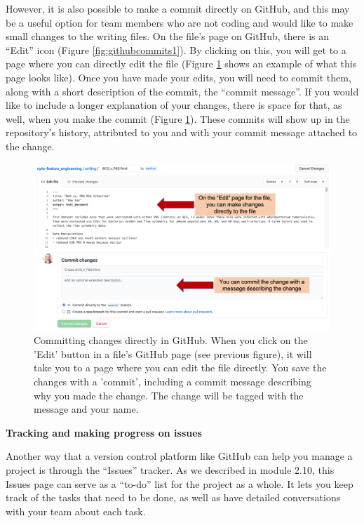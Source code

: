 \documentclass[]{tufte-book}
\begin{document}
However, it is also possible to make a commit directly on GitHub, and this may
be a useful option for team members who are not coding and would like to make
small changes to the writing files. On the file's page on GitHub, there is an
``Edit'' icon (Figure \ref{fig:githubcommits1}). By clicking on this, you will
get to a page where you can directly edit the file (Figure
\ref{fig:githubcommits2} shows an example of what this page looks like). Once
you have made your edits, you will need to commit them, along with a short
description of the commit, the ``commit message''. If you would like to include a
longer explanation of your changes, there is space for that, as well, when you
make the commit (Figure \ref{fig:githubcommits2}). These commits will show up
in the repository's history, attributed to you and with your commit message
attached to the change.

\begin{figure}
\includegraphics[width=\textwidth]{figures/github_commits2} \caption[Committing changes directly in GitHub]{Committing changes directly in GitHub. When you click on the 'Edit' button in a file's GitHub page (see previous figure), it will take you to a page where you can edit the file directly. You save the changes with a 'commit', including a commit message describing why you made the change. The change will be tagged with the message and your name.}\label{fig:githubcommits2}
\end{figure}

\textbf{Tracking and making progress on issues}

Another way that a version control platform like GitHub can help you manage a
project is through the ``Issues'' tracker. As we described in module 2.10,
this Issues page can serve as a ``to-do'' list for the project as a whole.
It lets you keep track of the tasks that need to be done, as well as
have detailed conversations with your team about each task.
\end{document}
